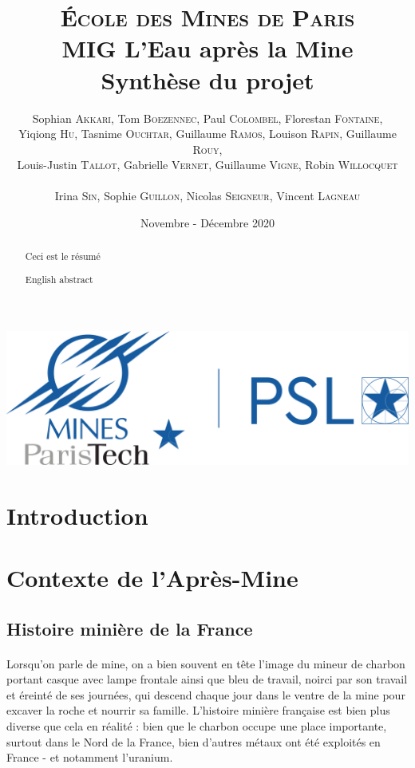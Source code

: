 \documentclass{article}
\title{\textbf{\LARGE{\textsc{École des Mines de Paris}}\\ \vspace{1 cm}MIG L'Eau après la Mine\\\vspace{0.8 cm}Synthèse du projet}\vspace{1 cm}}
\author{Sophian \textsc{Akkari}, Tom \textsc{Boezennec}, Paul \textsc{Colombel}, Florestan \textsc{Fontaine},\\ Yiqiong \textsc{Hu}, Tasnime \textsc{Ouchtar}, Guillaume \textsc{Ramos}, Louison \textsc{Rapin}, Guillaume \textsc{Rouy},\\ Louis-Justin \textsc{Tallot}, Gabrielle \textsc{Vernet}, Guillaume \textsc{Vigne}, Robin \textsc{Willocquet}\\ \\ Irina \textsc{Sin}, Sophie \textsc{Guillon}, Nicolas \textsc{Seigneur}, Vincent \textsc{Lagneau}}
\date{\vspace{2 cm}Novembre - Décembre 2020}
\begin{document}

\maketitle
\thispagestyle{empty}
\vspace{2 cm}
\begin{center}
    \includegraphics[width = 0.4\linewidth]{logoMPT.png}
\end{center}


\newpage
{}
\tableofcontents

\newpage

\begin{abstract}
    Ceci est le résumé
\end{abstract}


{
\begin{abstract}
    English abstract
\end{abstract}
}

\newpage
{}
\section*{Introduction}

\newpage

\section{Contexte de l’Après-Mine}
\subsection{Histoire minière de la France}




\paragraph{} Lorsqu’on parle de mine, on a bien souvent en tête l’image du mineur de charbon portant casque avec lampe frontale ainsi que bleu de travail, noirci par son travail et éreinté de ses journées, qui descend chaque jour dans le ventre de la mine pour excaver la roche et nourrir sa famille. L’histoire minière française est bien plus diverse que cela en réalité : bien que le charbon occupe une place importante, surtout dans le Nord de la France, bien d’autres métaux ont été exploités en France - et notamment l’uranium.
\end{document}
